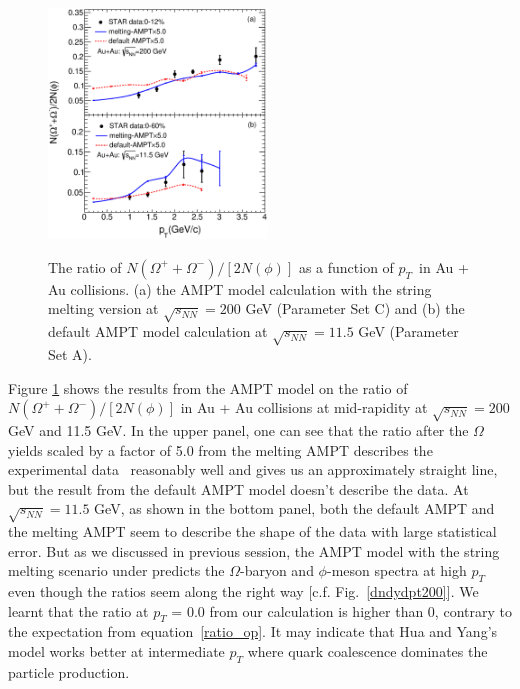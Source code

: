 \documentclass[twocolumn,aps,prc,showpacs,superscriptaddress,preprintnumbers,floatfix,nofootinbib]{revtex4}
\newcommand{ \pt } {${p_{T}}$}
\begin{document}
\begin{CJK*}{GBK}{song}
    \begin{figure}[htbp]
      \includegraphics[width=0.52\textwidth]{Fig3_paper_ratio.eps}\\
      \caption{The ratio of $N(\Omega ^++\Omega^-)/[2N(\phi)]$ as a function of \pt ~in Au + Au collisions. (a) the AMPT  model calculation with the string melting version at $\sqrt{s_{NN}} =  200$ GeV (Parameter Set C) and (b)  the default AMPT model calculation at $\sqrt{s_{NN}} = 11.5$ GeV (Parameter Set A). }
      \label{ratio200}
    \end{figure}

Figure \ref{ratio200} shows the results from the AMPT model on the ratio of $N(\Omega ^++\Omega^-)/[2N(\phi)]$ in Au + Au collisions at mid-rapidity at $\sqrt{s_{NN}} = 200$ GeV and 11.5 GeV. In the upper panel, one can see that the ratio after the $\Omega$ yields scaled by a factor of 5.0 from the melting AMPT describes the experimental data~\cite{OmegaphiSTAR} reasonably well and gives us an approximately straight line, but the result from the default AMPT model doesn't describe the data. At $\sqrt{s_{NN}} = 11.5$ GeV, as shown in the bottom panel, both the default AMPT and the melting AMPT seem to describe the shape of the data with large statistical error. But as we discussed in previous session, the AMPT model with the string melting scenario under predicts the $\Omega$-baryon and $\phi$-meson spectra at high $p_T$ even though the ratios seem along the right way [c.f. Fig.~\ref{dndydpt200}]. We learnt that the ratio at $p_T$ = 0.0 from our calculation is higher than 0, contrary to the expectation from equation~\ref{ratio_op}. It may indicate that Hua and Yang's model works better at intermediate $p_T$ where quark coalescence dominates the particle production.



\end{CJK*}
\end{document}
